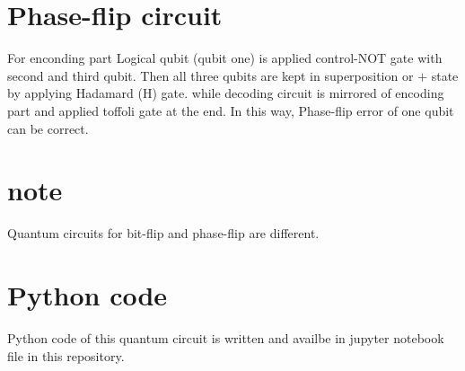 \documentclass[a4paper, 12pt]{scrartcl}
\begin{document}
\section{Phase-flip circuit}
  For enconding part Logical qubit (qubit one) is applied control-NOT gate with second and third qubit.
  Then all three qubits are kept in superposition or $+$ state by applying Hadamard (H) gate.
  while decoding circuit is mirrored of encoding part and applied toffoli gate at the end.
  In this way, Phase-flip error of one qubit can be correct.

\section{note}
  Quantum circuits for bit-flip and phase-flip are different.

\section{Python code}
Python code of this quantum circuit is written and availbe in jupyter notebook file in this repository.
\end{document}
